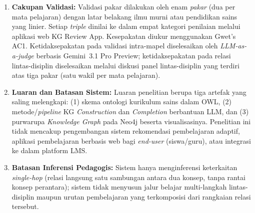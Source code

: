 \documentclass[../../thesis]{subfiles}
\begin{document}
\begin{enumerate}
  \item \textbf{Cakupan Validasi:} Validasi pakar dilakukan oleh enam
        \textit{pakar} (dua per mata pelajaran) dengan latar belakang ilmu
        murni atau pendidikan sains yang linier. Setiap \textit{triple} dinilai
        ke dalam empat kategori penilaian melalui aplikasi web KG Review App. Kesepakatan
        diukur menggunakan Gwet's AC1. Ketidaksepakatan pada validasi
        intra-mapel diselesaikan oleh \textit{LLM-as-a-judge} berbasis
        Gemini~3.1 Pro Preview; ketidaksepakatan pada relasi lintas-disiplin
        diselesaikan melalui diskusi panel lintas-disiplin yang terdiri atas
        tiga pakar (satu wakil per mata pelajaran).

  \item \textbf{Luaran dan Batasan Sistem:} Luaran penelitian berupa tiga artefak
        yang saling melengkapi: (1) skema ontologi kurikulum sains dalam OWL,
        (2) metode/\textit{pipeline} KG \textit{Construction} dan \textit{Completion}
        berbantuan LLM, dan (3) purwarupa \textit{Knowledge Graph} pada Neo4j
        beserta visualisasinya. Penelitian ini tidak mencakup pengembangan sistem
        rekomendasi pembelajaran adaptif, aplikasi pembelajaran berbasis web bagi
        \textit{end-user} (siswa/guru), atau integrasi ke dalam platform LMS.

  \item \textbf{Batasan Inferensi Pedagogis:} Sistem hanya menginferensi
        keterkaitan \textit{single-hop} (relasi langsung satu sambungan
        antara dua konsep, tanpa rantai konsep perantara); sistem tidak
        menyusun jalur belajar multi-langkah lintas-disiplin maupun urutan
        pembelajaran yang terkomposisi dari rangkaian relasi tersebut.
\end{enumerate}

\ifSubfilesClassLoaded{\printbibliography[title={Daftar Pustaka}]}{}
\end{document}
